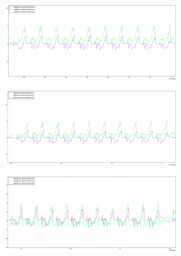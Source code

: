 \documentclass[USenglish]{ifimaster}  %
\begin{document}
\begin{figure} [h]
	\centering
	\begin{subfigure}[b]{\textwidth}
		\includegraphics[width=\textwidth,height=\textheight,keepaspectratio]{Figures/gulvgraf}
		\caption{}
		\label{fig:gulvgraf} 
	\end{subfigure}
	
	\begin{subfigure}[b]{\textwidth}
			\includegraphics[width=\textwidth,height=\textheight,keepaspectratio]{Figures/teppegraf}
		\caption{}
		\label{fig:teppegraf}
	\end{subfigure}

	\begin{subfigure}[h]{\textwidth}
	\includegraphics[width=\textwidth,height=\textheight,keepaspectratio]{Figures/mattebgraf}
	\caption{}
	\label{fig:mattebgraf}
	\end{subfigure}

\end{figure}
\end{document}
